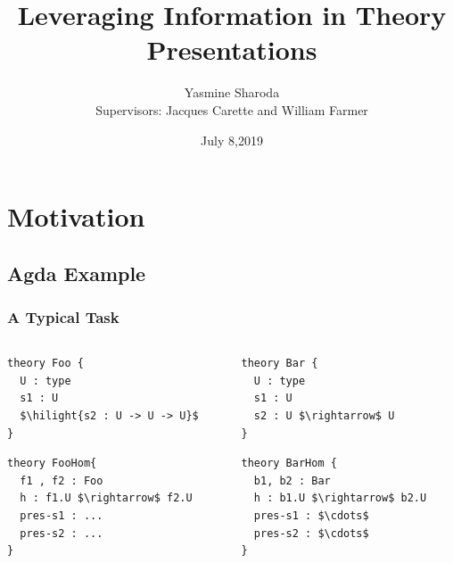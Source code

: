 \documentclass[t,12pt,numbers,fleqn,usenames,xcolor=dvipsnames]{beamer}
\title{Leveraging Information in Theory Presentations}
\author{Yasmine Sharoda\\ \vspace{0.5cm} Supervisors: Jacques Carette and William Farmer}
\institute[]{Department of Computing and Software, McMaster University}
\date{July 8,2019}
\newcommand{\hilight}[1]{\colorbox{yellow}{#1}}
\begin{document}
\begin{frame}
\titlepage
\end{frame}

\section{Motivation}
\begin{frame}[fragile]

\end{frame}

\subsection{Agda Example}
\begin{frame}[fragile]
\frametitle{A Typical Task}
\begin{columns}
	\begin{column}{0.45\textwidth}
		\begin{lstlisting}[mathescape]
theory Foo { 
  U : type 
  s1 : U 
  $\hilight{s2 : U -> U -> U}$
}
		\end{lstlisting}
		\begin{lstlisting}
theory FooHom{
  f1 , f2 : Foo 
  h : f1.U $\rightarrow$ f2.U 
  pres-s1 : ... 
  pres-s2 : ... 
}
		\end{lstlisting}
	\end{column}
	\begin{column}{0.45\textwidth}
	 	\begin{lstlisting}
theory Bar {
  U : type 
  s1 : U 
  s2 : U $\rightarrow$ U 
}
	 	\end{lstlisting}
\pause
		\begin{lstlisting}
theory BarHom { 
  b1, b2 : Bar 
  h : b1.U $\rightarrow$ b2.U 
  pres-s1 : $\cdots$
  pres-s2 : $\cdots$
}
		\end{lstlisting}
	\end{column}
\end{columns}
\end{frame}
\end{document}

